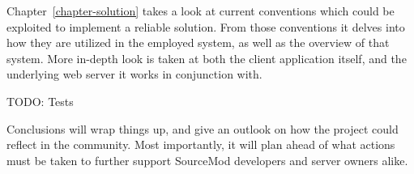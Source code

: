 Chapter~\ref{chapter-solution} takes a look at current conventions which could be exploited to implement a reliable solution.
From those conventions it delves into how they are utilized in the employed system, as well as the overview of that system.
More in-depth look is taken at both the client application itself, and the underlying web server it works in conjunction with.

TODO: Tests

Conclusions will wrap things up, and give an outlook on how the project could reflect in the community.
Most importantly, it will plan ahead of what actions must be taken to further support SourceMod developers and server owners alike.
